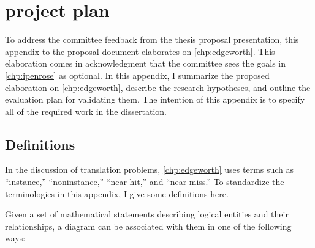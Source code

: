 
\chapter{\Edgeworth project plan}

To address the committee feedback from the thesis proposal presentation, this appendix to the proposal document elaborates on \cref{chp:edgeworth}. This elaboration comes in acknowledgment that the committee sees the goals in \cref{chp:ipenrose} as optional.  In this appendix, I summarize the proposed elaboration on \cref{chp:edgeworth}, describe the research hypotheses, and outline the evaluation plan for validating them. The intention of this appendix is to specify all of the required work in the dissertation.




\section{Definitions}
\label{sec:definitions}

In the discussion of translation problems, \cref{chp:edgeworth} uses terms such as ``instance,'' ``noninstance,'' ``near hit,'' and ``near miss.'' To standardize the terminologies in this appendix, I give some definitions here.

Given a set of mathematical statements describing logical entities and their relationships, a diagram can be associated with them in one of the following ways:

